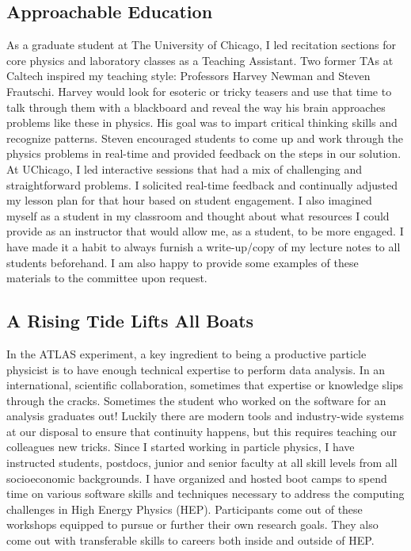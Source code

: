 \subsection{Approachable Education} \label{ssec:approachable-education}
As a graduate student at The University of Chicago, I led recitation sections for core physics and laboratory classes as a Teaching Assistant. Two former TAs at Caltech inspired my teaching style: Professors Harvey Newman and Steven Frautschi. Harvey would look for esoteric or tricky teasers and use that time to talk through them with a blackboard and reveal the way his brain approaches problems like these in physics. His goal was to impart critical thinking skills and recognize patterns. Steven encouraged students to come up and work through the physics problems in real-time and provided feedback on the steps in our solution. At UChicago, I led interactive sessions that had a mix of challenging and straightforward problems. I solicited real-time feedback and continually adjusted my lesson plan for that hour based on student engagement. I also imagined myself as a student in my classroom and thought about what resources I could provide as an instructor that would allow me, as a student, to be more engaged. I have made it a habit to always furnish a write-up/copy of my lecture notes to all students beforehand. I am also happy to provide some examples of these materials to the committee upon request.

\subsection{A Rising Tide Lifts All Boats} \label{ssec:a-rising-tide-lifts-all-boats}
In the ATLAS experiment, a key ingredient to being a productive particle physicist is to have enough technical expertise to perform data analysis. In an international, scientific collaboration, sometimes that expertise or knowledge slips through the cracks. Sometimes the student who worked on the software for an analysis graduates out! Luckily there are modern tools and industry-wide systems at our disposal to ensure that continuity happens, but this requires teaching our colleagues new tricks. %
Since I started working in particle physics, I have instructed students, postdocs, junior and senior faculty at all skill levels from all socioeconomic backgrounds. I have organized and hosted boot camps to spend time on various software skills and techniques necessary to address the computing challenges in High Energy Physics (HEP). Participants come out of these workshops equipped to pursue or further their own research goals. They also come out with transferable skills to careers both inside and outside of HEP.

